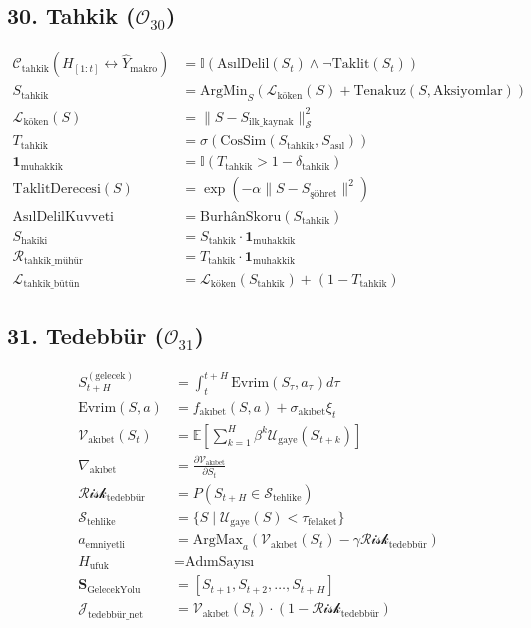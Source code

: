 \documentclass[11pt, a4paper]{article}
\begin{document}
\subsection{30. Tahkik ($\mathcal{O}_{30}$)}
\begin{align}
\mathcal{C}_{\text{tahkik}}(H_{[1:t]} \leftrightarrow \hat{Y}_{\text{makro}}) &= \mathbb{I}\left( \text{AsılDelil}(S_t) \land \neg \text{Taklit}(S_t) \right) \\
S_{\text{tahkik}} &= \text{ArgMin}_{S} \left( \mathcal{L}_{\text{köken}}(S) + \text{Tenakuz}(S, \text{Aksiyomlar}) \right) \\
\mathcal{L}_{\text{köken}}(S) &= \| S - S_{\text{ilk\_kaynak}} \|_{\mathcal{S}}^2 \\
T_{\text{tahkik}} &= \sigma\left( \text{CosSim}(S_{\text{tahkik}}, S_{\text{asıl}}) \right) \\
\mathbf{1}_{\text{muhakkik}} &= \mathbb{I}(T_{\text{tahkik}} > 1 - \delta_{\text{tahkik}}) \\
\text{TaklitDerecesi}(S) &= \exp(-\alpha \|S - S_{\text{şöhret}}\|^2) \\
\text{AsılDelilKuvveti} &= \text{BurhânSkoru}(S_{\text{tahkik}}) \\
S_{\text{hakiki}} &= S_{\text{tahkik}} \cdot \mathbf{1}_{\text{muhakkik}} \\
\mathcal{R}_{\text{tahkik\_mühür}} &= T_{\text{tahkik}} \cdot \mathbf{1}_{\text{muhakkik}} \\
\mathcal{L}_{\text{tahkik\_bütün}} &= \mathcal{L}_{\text{köken}}(S_{\text{tahkik}}) + (1 - T_{\text{tahkik}})
\end{align}

\subsection{31. Tedebbür ($\mathcal{O}_{31}$)}
\begin{align}
S_{t+H}^{(\text{gelecek})} &= \int_t^{t+H} \text{Evrim}(S_\tau, a_\tau) d\tau \\
\text{Evrim}(S, a) &= f_{\text{akıbet}}(S, a) + \sigma_{\text{akıbet}} \xi_t \\
\mathcal{V}_{\text{akıbet}}(S_t) &= \mathbb{E}\left[ \sum_{k=1}^H \beta^k \mathcal{U}_{\text{gaye}}(S_{t+k}) \right] \\
\nabla_{\text{akıbet}} &= \frac{\partial \mathcal{V}_{\text{akıbet}}}{\partial S_t} \\
\mathcal{Risk}_{\text{tedebbür}} &= P(S_{t+H} \in \mathcal{S}_{\text{tehlike}}) \\
\mathcal{S}_{\text{tehlike}} &= \{ S \mid \mathcal{U}_{\text{gaye}}(S) < \tau_{\text{felaket}} \} \\
a_{\text{emniyetli}} &= \text{ArgMax}_a \left( \mathcal{V}_{\text{akıbet}}(S_t) - \gamma \mathcal{Risk}_{\text{tedebbür}} \right) \\
H_{\text{ufuk}} &= \text{AdımSayısı} \\
\mathbf{S}_{\text{GelecekYolu}} &= [S_{t+1}, S_{t+2}, \dots, S_{t+H}] \\
\mathcal{J}_{\text{tedebbür\_net}} &= \mathcal{V}_{\text{akıbet}}(S_t) \cdot (1 - \mathcal{Risk}_{\text{tedebbür}})
\end{align}
\end{document}
